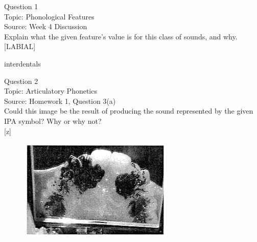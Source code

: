 \documentclass[12pt]{article}
\begin{document}
\begin{center}
\textbf{{\color{blue}{\HUGE START OF EXAM\\}}}

\textbf{{\color{blue}{\HUGE Student ID: 44365\\}}}

\textbf{{\color{blue}{\HUGE 4:30\\}}}

\end{center}
\newpage

{\large Question 1}\\

Topic: Phonological Features\\
Source: Week 4 Discussion\\

Explain what the given feature’s value is for this class of sounds, and why.\\

{[LABIAL]}

interdentals


\newpage

{\large Question 2}\\

Topic: Articulatory Phonetics\\
Source: Homework 1, Question 3(a)\\

Could this image be the result of producing the sound represented by the given IPA symbol? Why or why not?\\

{[z]}

\begin{figure}[H]
\includegraphics{../images/staticpalatography_fricative.png}
\end{figure}

\newpage

\begin{center}
\textbf{{\color{red}{\HUGE END OF EXAM}}}\\

\end{center}
\newpage
\end{document}
